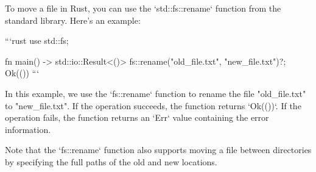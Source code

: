 To move a file in Rust, you can use the `std::fs::rename` function from the standard library. Here's an example:

```rust
use std::fs;

fn main() -> std::io::Result<()> {
    fs::rename("old_file.txt", "new_file.txt")?;
    Ok(())
}
```

In this example, we use the `fs::rename` function to rename the file "old_file.txt" to "new_file.txt". If the operation succeeds, the function returns `Ok(())`. If the operation fails, the function returns an `Err` value containing the error information.

Note that the `fs::rename` function also supports moving a file between directories by specifying the full paths of the old and new locations.
